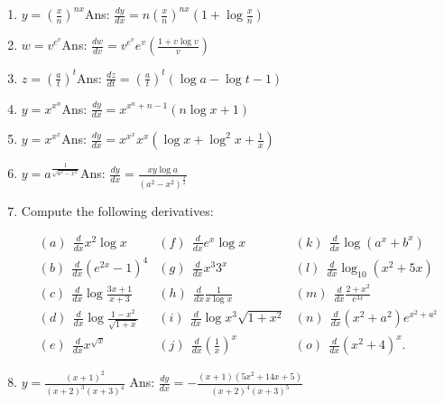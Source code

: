 \begin{enumerate}
\item
$y = \left ( \frac{x}{n} \right )^{nx}$\qquad\qquad\qquad\qquad\qquad\qquad Ans: 	
$\frac{dy}{dx} = n \left ( \frac{x}{n} \right )^{nx} \left ( 1 + \log \frac{x}{n} \right )$

\item
$w = v^{e^v}$\qquad\qquad\qquad\qquad\qquad\qquad Ans: 	
$\frac{dw}{dv} = v^{e^v} e^v \left ( \frac{1 + v \log v}{v} \right )$

\item
$z = \left ( \frac{a}{t} \right )^t$\qquad\qquad\qquad\qquad\qquad\qquad Ans: 	$\frac{dz}{dt} 
= \left ( \frac{a}{t} \right )^t (\log a - \log t - 1)$

\item
$y = x^{x^n}$\qquad\qquad\qquad\qquad\qquad\qquad Ans: 	$\frac{dy}{dx} = x^{x^n + n - 1}(n \log x + 1)$

\item
$y = x^{x^x}$\qquad\qquad\qquad\qquad\qquad\qquad Ans: 	$\frac{dy}{dx} = x^{x^x} x^x \left ( \log x + \log^2 x + \frac{1}{x} \right )$

\item
$y = a^{\frac{1}{\sqrt{a^2 - x^2}}}$\qquad\qquad\qquad\qquad\qquad\qquad Ans: 	$\frac{dy}{dx} = \frac{xy \log a}{(a^2 - x^2)^{\frac{3}{2}}}$

\item
Compute the following derivatives: %

\[
\begin{array}{lll}
(a)\ \  \frac{d}{dx} x^2 \log x &  	(f)\ \  \frac{d}{dx} e^x \log x &  	(k)\ \  \frac{d}{dx} \log (a^x + b^x) \\
(b)\ \  \frac{d}{dx} (e^{2x} - 1)^4 &  	(g)\ \  \frac{d}{dx} x^3 3^x &	(l)\ \  \frac{d}{dx} \log_10 (x^2 + 5x)\\
(c)\ \  \frac{d}{dx} \log \frac{3x + 1}{x + 3} &  	(h)\ \  \frac{d}{dx} \frac{1}{x \log x} &  	(m)\ \  \frac{d}{dx} \frac{2 + x^2}{e^{3x}}\\
(d)\ \  \frac{d}{dx} \log \frac{1 - x^2}{\sqrt{1 + x}} &  	(i)\ \  \frac{d}{dx} \log x^3 \sqrt{1 + x^2} &  	(n)\ \  \frac{d}{dx} (x^2 + a^2) e^{x^2 + a^2}\\
(e)\ \  \frac{d}{dx} x^{\sqrt{x}} &  	(j)\ \  \frac{d}{dx} \left ( \frac{1}{x} \right )^x &  	(o)\ \  \frac{d}{dx} (x^2 + 4)^x.
\end{array}
\]

\item
$y = \frac{(x + 1)^2}{(x + 2)^3 (x + 3)^4}$
\qquad\qquad\qquad\qquad\qquad\qquad Ans: 
 	$\frac{dy}{dx} = -\frac{(x + 1)(5x^2 + 14x + 5)}{(x + 2)^4 (x + 3)^5}$


\end{enumerate}
